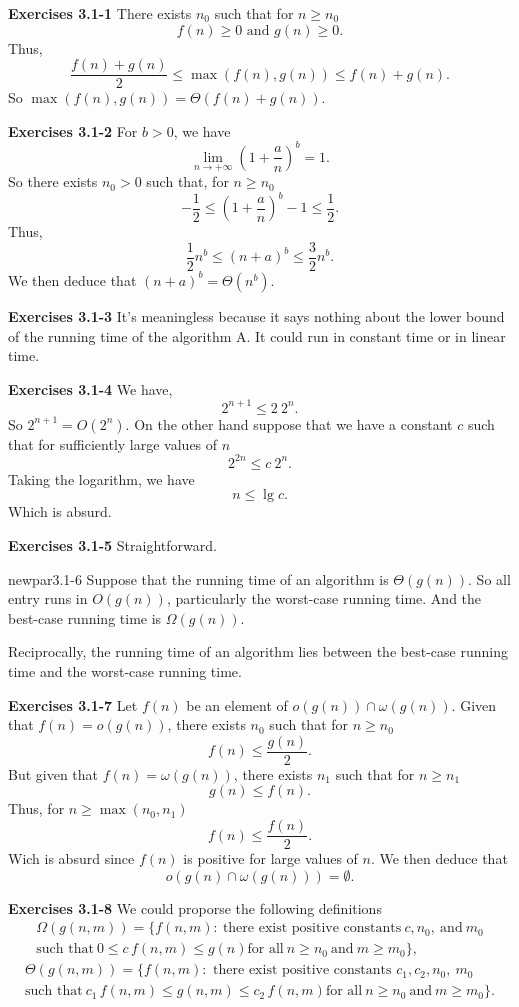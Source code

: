 \documentclass[a4paper,12pt]{article}
\newcommand{\newpar}[1]
{\bigskip \noindent \textbf{Exercises #1} \newline}
\begin{document}
\newpar{3.1-1}
There exists $n_0$ such that for $n \ge n_0$
\[ f(n) \ge 0 \mbox{ and }g(n) \ge 0.\]
Thus,
\[\frac{f(n) + g(n)}{2} \le \max(f(n), g(n)) \le
f(n) + g(n).\]
So $\max(f(n), g(n)) = \Theta(f(n) + g(n))$.

\newpar{3.1-2}
For $b > 0$, we have
\[ \lim_{n \to +\infty}\left(1 + \frac{a}{n}\right)^b = 1.\]
So there exists $n_0 > 0$ such that, for $n \ge n_0$
\[ - \frac{1}{2} \le \left(1 + \frac{a}{n}\right)^b - 1
\le \frac{1}{2}.\]
Thus,
\[ \frac{1}{2} n^b \le (n + a)^b \le \frac{3}{2} n^b.\]
We then deduce that $(n+a)^b = \Theta(n^b)$.

\newpar{3.1-3}
It's meaningless because it says nothing about the lower bound of the
running time of the algorithm A.  It could run in constant time or in
linear time.

\newpar{3.1-4}
We have,
\[ 2^{n+1} \le 2\ 2^n.\]
So $2^{n+1} = O(2^n)$.  On the other hand suppose that we have a
constant $c$ such that for sufficiently large values of $n$
\[ 2^{2n} \le c\ 2^n.\]
Taking the logarithm, we have
\[ n \le \lg c.\]
Which is absurd.

\newpar{3.1-5}
Straightforward.

newpar{3.1-6}
Suppose that the running time of an algorithm is $\Theta(g(n))$.  So
all entry runs in $O(g(n))$, particularly the worst-case running time.
And the best-case running time is $\Omega(g(n))$.

Reciprocally, the running time of an algorithm lies between the
best-case running time and the worst-case running time.

\newpar{3.1-7}
Let $f(n)$ be an element of $o(g(n)) \cap \omega(g(n))$.  Given
that $f(n) = o(g(n))$, there exists $n_0$ such that for $n \ge n_0$
\[ f(n) \le \frac{g(n)}{2}.\]
But given that $f(n) = \omega(g(n))$, there exists $n_1$ such that for
$n \ge n_1$
\[ g(n) \le f(n).\]
Thus, for $n \ge \max(n_0, n_1)$
\[ f(n) \le \frac{f(n)}{2}.\]
Wich is absurd since $f(n)$ is positive for large values of $n$.  We
then deduce that 
\[o(g(n) \cap \omega(g(n))) = \emptyset.\]

\newpar{3.1-8}
We could proporse the following definitions
\begin{eqnarray*}
\Omega(g(n, m)) = \{f(n,m):\ \mbox{there exist positive constants}\ 
c, n_0,\ \mbox{and}\ m_0\\ \mbox{such that}\ 0 \le c\,f(n,m) \le
g(n) \mbox{for all}\ n \ge n_0\ \mbox{and}\ m \ge m_0\},
\end{eqnarray*}
\begin{eqnarray*}
\Theta(g(n, m)) = \{f(n,m): \mbox{ there exist positive constants } 
c_1, c_2, n_0,\  m_0\\ \mbox{such that}\ c_1\,f(n,m) \le
g(n,m) \le c_2\,f(n,m) \mbox{for all}\ n \ge n_0\ \mbox{and}\ m \ge m_0\}.
\end{eqnarray*}
\end{document}
